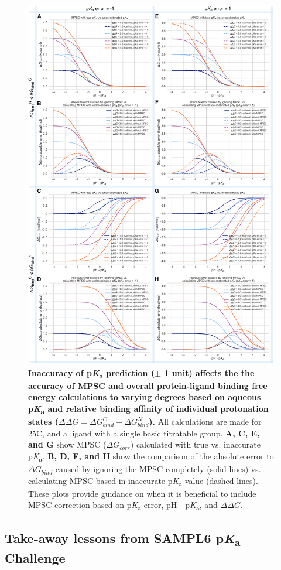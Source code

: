 \documentclass[9pt,lineno,final]{elife}
\newcommand{\pKa}{p\textit{K}\textsubscript{a}}
\begin{document}
\begin{figure}
\centering
\includegraphics[width=0.8\linewidth]{figures/pKa-inaccuracy-and-MPSC.pdf}
\caption{ {\bf Inaccuracy of \pKa{} prediction ($\pm$ 1 unit) affects the the accuracy of MPSC and overall protein-ligand binding free energy calculations to varying degrees based on aqueous \pKa{} and relative binding affinity of individual protonation states ($\Delta\Delta G = \Delta G_{bind}^{C} - \Delta G_{bind}^{N}$).} 
All calculations are made for 25\degree C, and a ligand with a single basic titratable group. {\bf A, C, E, and G} show MPSC ($\Delta G_{corr}$) calculated with true vs. inaccurate \pKa{}. 
{\bf B, D, F, and H} show the comparison of the absolute error to $\Delta G_{bind}$ caused by ignoring the MPSC completely (solid lines) vs. calculating MPSC based in inaccurate \pKa{} value (dashed lines). 
These plots provide guidance on when it is beneficial to include MPSC correction based on \pKa{} error, pH - \pKa{}, and $\Delta\Delta G$. 
}
\label{fig:pKa-inaccuracy-and-MPSC}
\end{figure}



\subsection{Take-away lessons from SAMPL6 \pKa{} Challenge}
\end{document}
